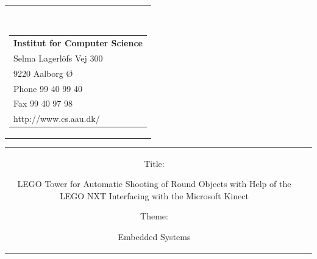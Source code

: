 

{}
\thispagestyle{empty}
\begin{titlepage}
\begin{nopagebreak}
{\samepage 
\begin{tabular}{r}
\parbox{\textwidth}{  \\
\hfill \parbox{8cm}{\begin{tabular}{l} %
{\small \textbf{Institut for Computer Science}}\\
{\small Selma Lagerlöfs Vej 300} \\
{\small 9220 Aalborg Ø} \\
{\small Phone 99 40 99 40} \\
{\small Fax 99 40 97 98} \\
{\small http://www.cs.aau.dk/}
\end{tabular}}}

\end{tabular}

\begin{tabular}{cc}
\parbox{7cm}{
\begin{description}

\item { Title:} 

LEGO Tower for Automatic Shooting of Round Objects with Help of the LEGO NXT Interfacing with the Microsoft Kinect \\
  
\item { Theme:} 

Embedded Systems

\end{description}

\parbox{8cm}{

}}
\end{tabular}}
\end{nopagebreak}
\end{titlepage}
